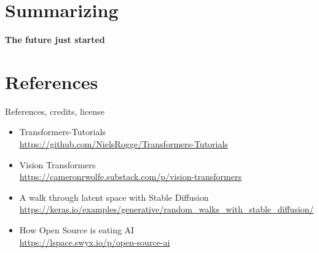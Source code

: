 \documentclass[17pt,aspectratio=169,hyperref={pdfusetitle,colorlinks,allcolors=olive}]{beamer}
\begin{document}

  


\section{Summarizing}

\begin{frame}[fragile]

  {\Large \bf
    The future just started
  }
\end{frame}


\section*{References}

\begin{frame}[fragile]

  {\huge References, credits, license}
\end{frame}

\begin{frame}[fragile]

  {\small
    \begin{itemize}
    \item Transformers-Tutorials \\
      {\scriptsize \url{https://github.com/NielsRogge/Transformers-Tutorials}}
    \item Vision Transformers \\
      {\scriptsize \url{https://cameronrwolfe.substack.com/p/vision-transformers}}
    \item A walk through latent space with Stable Diffusion \\
      {\scriptsize \url{https://keras.io/examples/generative/random_walks_with_stable_diffusion/}}
    \item How Open Source is eating AI \\
      {\scriptsize \url{https://lspace.swyx.io/p/open-source-ai}}
    \end{itemize}
  }  
\end{frame}
\end{document}
